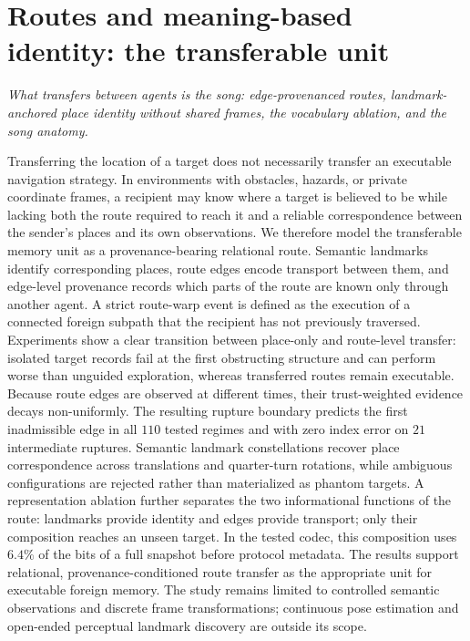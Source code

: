 \documentclass{article}
\begin{document}
\FloatBarrier



\section{Routes and meaning-based identity: the transferable unit}
\label{p3:sec:routes-lead}
\emph{What transfers between agents is the song: edge-provenanced routes, landmark-anchored place identity without shared frames, the vocabulary ablation, and the song anatomy.}

Transferring the location of a target does not necessarily transfer an
executable navigation strategy. In environments with obstacles,
hazards, or private coordinate frames, a recipient may know where a
target is believed to be while lacking both the route required to
reach it and a reliable correspondence between the sender's places and
its own observations. We therefore model the transferable memory unit
as a provenance-bearing relational route. Semantic landmarks identify
corresponding places, route edges encode transport between them, and
edge-level provenance records which parts of the route are known only
through another agent. A strict route-warp event is defined as the
execution of a connected foreign subpath that the recipient has not
previously traversed. Experiments show a clear transition between
place-only and route-level transfer: isolated target records fail at
the first obstructing structure and can perform worse than unguided
exploration, whereas transferred routes remain executable. Because
route edges are observed at different times, their trust-weighted
evidence decays non-uniformly. The resulting rupture boundary predicts the
first inadmissible edge in all $110$ tested regimes and with zero
index error on $21$ intermediate ruptures. Semantic landmark
constellations recover place correspondence across translations and
quarter-turn rotations, while ambiguous configurations are rejected
rather than materialized as phantom targets. A representation
ablation further separates the two informational functions of the
route: landmarks provide identity and edges provide transport; only
their composition reaches an unseen target. In the tested codec, this
composition uses $6.4\%$ of the bits of a full snapshot before protocol
metadata. The results support relational, provenance-conditioned route
transfer as the appropriate unit for executable foreign memory. The
study remains limited to controlled semantic observations and discrete
frame transformations; continuous pose estimation and open-ended
perceptual landmark discovery are outside its scope.
\end{document}
